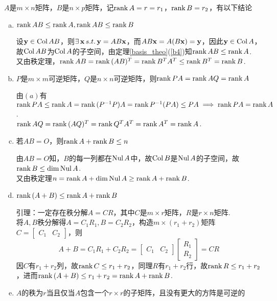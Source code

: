 \begin{theorem}[秩的进阶定理]%
$A$是$m\times n$矩阵，$B$是$n\times p$矩阵，记$\mathrm{rank}\, A=r=r_1$，$\mathrm{rank}\, B=r_2$，有以下结论
\begin{enumerate}[(a)]
	\itemsep -3pt
	\item $\mathrm{rank}\, AB\leq \mathrm{rank}\, A,\mathrm{rank}\, AB\leq \mathrm{rank}\, B$
	\begin{analysis}
	设$\mathbf{y}\in\mathrm{Col}\, AB$，则$\exists\,\mathbf{x}\,s.t.\,\mathbf{y}=AB\mathbf{x}$，而$AB\mathbf{x}=A(B\mathbf{x})=\mathbf{y}$，因此$\mathbf{y}\in\mathrm{Col}\, A$，故$\mathrm{Col}\, AB$为$\mathrm{Col}\, A$的子空间，由定理\ref{basis_theo}(\ref{b4})知$\mathrm{rank}\, AB\leq \mathrm{rank}\, A$.\\
	又由秩定理，$\mathrm{rank}\, AB=\mathrm{rank}\,(AB)^T=\mathrm{rank}\, B^TA^T\leq\mathrm{rank}\, B^T=\mathrm{rank}\, B$.
	\end{analysis}
	\item $P$是$m\times m$可逆矩阵，$Q$是$n\times n$可逆矩阵，则$\mathrm{rank}\, PA=\mathrm{rank}\, AQ=\mathrm{rank}\, A$
	\begin{analysis}
	由$(a)$有$\mathrm{rank}\, PA\leq\mathrm{rank}\, A=\mathrm{rank}\,(P^{-1}P)A=\mathrm{rank}\, P^{-1}(PA)\leq PA\implies \mathrm{rank}\, PA=\mathrm{rank}\, A$.\\
	$\mathrm{rank}\, AQ=\mathrm{rank}\, (AQ)^T=\mathrm{rank}\, Q^TA^T=\mathrm{rank}\, A^T=\mathrm{rank}\, A$.
	\end{analysis}
	\item 若$AB=O$，则$\mathrm{rank}\, A+\mathrm{rank}\, B\leq n$
	\begin{analysis}
	由$AB=O$知，$B$的每一列都在$\mathrm{Nul}\, A$中，故$\mathrm{Col}\, B$是$\mathrm{Nul}\, A$的子空间，故$\mathrm{rank}\, B\leq \mathrm{dim}\,\mathrm{Nul}\, A$.\\
	又由秩定理$n=\mathrm{rank}\, A+\mathrm{dim}\, \mathrm{Nul}\, A\geq\mathrm{rank}\, A+\mathrm{rank}\, B$.
	\end{analysis}
	\item $\mathrm{rank}\,(A+B)\leq\mathrm{rank}\, A+\mathrm{rank}\, B$
	\begin{analysis}
	引理：一定存在秩分解$A=CR$，其中$C$是$m\times r$矩阵，$R$是$r\times n$矩阵.\\
	将$A,B$秩分解得$A=C_1R_1,B=C_2R_2$，构造$m\times (r_1+r_2)$矩阵$C=\begin{bmatrix}C_1&C_2\end{bmatrix}$，则
	\[A+B=C_1R_1+C_2R_2=\begin{bmatrix}C_1&C_2\end{bmatrix}\begin{bmatrix}R_1\\R_2\end{bmatrix}=CR\]
	因$C$有$r_1+r_2$列，故$\mathrm{rank}\, C\leq r_1+r_2$，同理$R$有$r_1+r_2$行，故$\mathrm{rank}\, R\leq r_1+r_2$，进而$\mathrm{rank}\, (A+B)\leq r_1+r_2=\mathrm{rank}\, A+\mathrm{rank}\, B$.
	\end{analysis}
	\item $A$的秩为$r$当且仅当$A$包含一个$r\times r$的子矩阵，且没有更大的方阵是可逆的

\end{enumerate}
\end{theorem}
